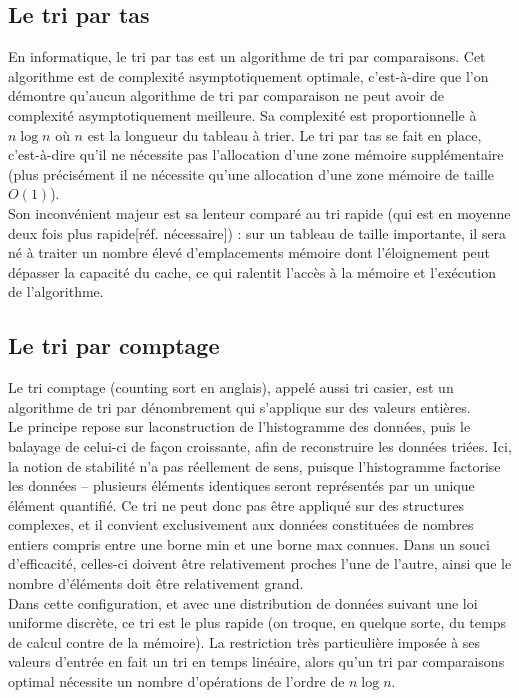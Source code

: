 \documentclass[11pt,a4paper]{article}
\begin{document}
\newpage

\subsection{Le tri par tas}
En informatique, le tri par tas est un algorithme de tri par comparaisons. Cet algorithme est de complexité asymptotiquement optimale, c'est-à-dire que l'on démontre
qu'aucun algorithme de tri par comparaison ne peut avoir de complexité asymptotiquement meilleure. Sa complexité est proportionnelle à $\displaystyle {n\log n}$
où $\displaystyle{n}$ est la longueur du tableau à trier. Le tri par tas se fait en place, c’est-à-dire qu’il ne nécessite pas l'allocation d'une zone mémoire supplémentaire
(plus précisément il ne nécessite qu'une allocation d'une zone mémoire de taille $\displaystyle {O(1)}$).\\
Son inconvénient majeur est sa lenteur comparé au tri rapide (qui est en moyenne deux fois plus rapide[réf. nécessaire]) : sur un tableau de taille importante, il sera
né à traiter un nombre élevé d'emplacements mémoire dont l’éloignement peut dépasser la capacité du cache, ce qui ralentit l'accès à la mémoire et l’exécution de l’algorithme.

\subsection{Le tri par comptage}
Le tri comptage (counting sort en anglais), appelé aussi tri casier, est un algorithme de tri par dénombrement qui s'applique sur des valeurs entières.\\
Le principe repose sur laconstruction de l'histogramme des données, puis le balayage de celui-ci de façon croissante, afin de reconstruire les données triées.
Ici, la notion de stabilité n'a pas réellement de sens, puisque l'histogramme factorise les données – plusieurs éléments identiques seront représentés par un unique
élément quantifié. Ce tri ne peut donc pas être appliqué sur des structures complexes, et il convient exclusivement aux données constituées de nombres entiers
compris entre une borne min et une borne max connues. Dans un souci d'efficacité, celles-ci doivent être relativement proches l'une de l'autre, ainsi que le nombre
d'éléments doit être relativement grand.\\
Dans cette configuration, et avec une distribution de données suivant une loi uniforme discrète, ce tri est le plus rapide (on troque, en quelque sorte, du temps de
calcul contre de la mémoire). La restriction très particulière imposée à ses valeurs d'entrée en fait un tri en temps linéaire, alors qu'un tri par comparaisons
optimal nécessite un nombre d'opérations de l'ordre de $\displaystyle{n\log n}$.
\end{document}

